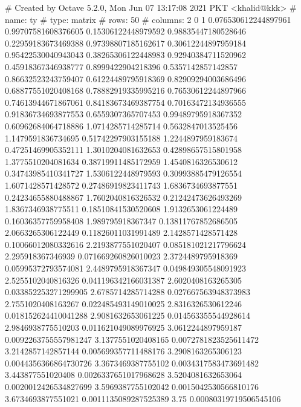 # Created by Octave 5.2.0, Mon Jun 07 13:17:08 2021 PKT <khalid@kkk>
# name: ty
# type: matrix
# rows: 50
# columns: 2
 0 1
 0.076530612244897961 0.99707581608376605
 0.15306122448979592 0.98835447180528646
 0.22959183673469388 0.97398807185162617
 0.30612244897959184 0.95422530040943043
 0.38265306122448983 0.92940384711520962
 0.45918367346938777 0.8999422904218396
 0.5357142857142857 0.86632523243759407
 0.61224489795918369 0.82909294003686496
 0.68877551020408168 0.78882919335995216
 0.76530612244897966 0.74613944671867061
 0.84183673469387754 0.70163472134936555
 0.91836734693877553 0.6559307365707453
 0.99489795918367352 0.60962684064718886
 1.0714285714285714 0.5632847013525456
 1.1479591836734695 0.51742297903155188
 1.2244897959183674 0.47251469905352111
 1.3010204081632653 0.42898657515801958
 1.3775510204081634 0.38719911485172959
 1.4540816326530612 0.34743985410341727
 1.5306122448979593 0.30993885479126554
 1.6071428571428572 0.27486919823411743
 1.6836734693877551 0.24234655880488867
 1.7602040816326532 0.21242473626493269
 1.8367346938775511 0.18510841530520608
 1.9132653061224489 0.16036357759958408
 1.989795918367347 0.13811767852686505
 2.0663265306122449 0.11826011031991489
 2.1428571428571428 0.10066012080332616
 2.2193877551020407 0.085181021217796624
 2.295918367346939 0.071669260826010023
 2.3724489795918369 0.05995372793574081
 2.4489795918367347 0.049849305548091923
 2.5255102040816326 0.041196342166031387
 2.6020408163265305 0.033852253271299905
 2.6785714285714288 0.027667563948373983
 2.7551020408163267 0.022485493149010025
 2.8316326530612246 0.018152624410041288
 2.9081632653061225 0.014563355544928614
 2.9846938775510203 0.011621049089976925
 3.0612244897959187 0.0092263755557981247
 3.1377551020408165 0.0072781823525611472
 3.2142857142857144 0.005699357711488176
 3.2908163265306123 0.0044356366864730726
 3.3673469387755102 0.0034317583473691482
 3.443877551020408 0.0026337651017968628
 3.5204081632653064 0.0020012426534827699
 3.5969387755102042 0.0015042530566810176
 3.6734693877551021 0.0011135089287525389
 3.75 0.00080319719506545106


